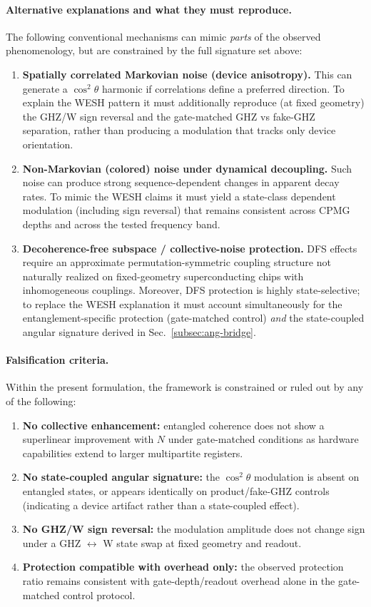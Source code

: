 \documentclass[12pt,a4paper]{article}
\numberwithin{equation}{section}
\begin{document}
\paragraph{Alternative explanations and what they must reproduce.}
The following conventional mechanisms can mimic \emph{parts} of the observed phenomenology,
but are constrained by the full signature set above:
\begin{enumerate}[leftmargin=1.6cm,itemsep=0.25cm]
\item \textbf{Spatially correlated Markovian noise (device anisotropy).}
This can generate a $\cos^2\theta$ harmonic if correlations define a preferred direction.
To explain the WESH pattern it must additionally reproduce (at fixed geometry) the GHZ/W sign reversal
and the gate-matched GHZ vs fake-GHZ separation, rather than producing a modulation that tracks only
device orientation.
\item \textbf{Non-Markovian (colored) noise under dynamical decoupling.}
Such noise can produce strong sequence-dependent changes in apparent decay rates.
To mimic the WESH claims it must yield a state-class dependent modulation (including sign reversal)
that remains consistent across CPMG depths and across the tested frequency band.
\item \textbf{Decoherence-free subspace / collective-noise protection.}
DFS effects require an approximate permutation-symmetric coupling structure not naturally realized on
fixed-geometry superconducting chips with inhomogeneous couplings.
Moreover, DFS protection is highly state-selective; to replace the WESH explanation it must account
simultaneously for the entanglement-specific protection (gate-matched control) \emph{and} the
state-coupled angular signature derived in Sec.~\ref{subsec:ang-bridge}.
\end{enumerate}



\paragraph{Falsification criteria.}
Within the present formulation, the framework is constrained or ruled out by any of the following:
\begin{enumerate}[leftmargin=1.6cm,itemsep=0.2cm]
\item \textbf{No collective enhancement:} entangled coherence does not show a superlinear improvement with $N$
under gate-matched conditions as hardware capabilities extend to larger multipartite registers.
\item \textbf{No state-coupled angular signature:} the $\cos^2\theta$ modulation is absent on entangled states,
or appears identically on product/fake-GHZ controls (indicating a device artifact rather than a state-coupled effect).
\item \textbf{No GHZ/W sign reversal:} the modulation amplitude does not change sign under a GHZ $\leftrightarrow$ W
state swap at fixed geometry and readout.
\item \textbf{Protection compatible with overhead only:} the observed protection ratio remains consistent with
gate-depth/readout overhead alone in the gate-matched control protocol.
\end{enumerate}
\end{document}
